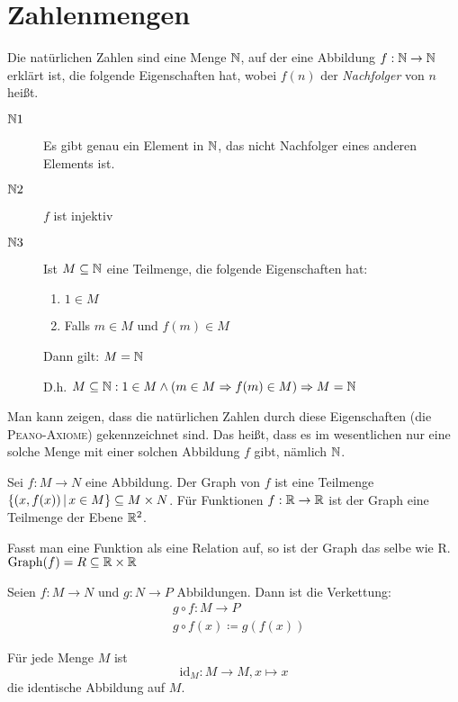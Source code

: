 \section{Zahlenmengen}
Die natürlichen Zahlen sind eine Menge $\mathbb{N}$, auf der eine Abbildung $f:\mathbb{N}\rightarrow\mathbb{N}$ erklärt ist, die folgende Eigenschaften hat, wobei $f(n)$ der \emph{Nachfolger} von $n$ heißt.
\begin{description}
  \item[$\mathbb{N} 1$] Es gibt genau ein Element in $\mathbb{N}$, das nicht Nachfolger eines anderen Elements ist.
  \item[$\mathbb{N} 2$] $f$ ist injektiv
  \item[$\mathbb{N} 3$] Ist $M\subseteq \mathbb{N}$ eine Teilmenge, die folgende Eigenschaften hat:
  \begin{enumerate}
    \item $1\in M$
    \item Falls $m\in M$ und $f(m)\in M$
  \end{enumerate}
  Dann gilt: $M = \mathbb{N}$

  D.h. $M\subseteq \mathbb{N} : 1\in M \wedge (m\in M \Rightarrow f(m)\in M) \Rightarrow M=\mathbb{N}$
\end{description}

Man kann zeigen, dass die natürlichen Zahlen durch diese Eigenschaften (die \textsc{Peano-Axiome}) gekennzeichnet sind. Das heißt, dass es im wesentlichen nur eine solche Menge mit einer solchen Abbildung $f$ gibt, nämlich $\mathbb{N}$.


Sei $f:M\rightarrow N$ eine Abbildung. Der Graph von $f$ ist eine Teilmenge $\left\{ (x,f(x)) \,\middle|\, x\in M \right\}\subseteq M\times N$.
Für Funktionen $f:\mathbb{R}\rightarrow\mathbb{R}$ ist der Graph eine Teilmenge der Ebene $\mathbb{R}^2$.

Fasst man eine Funktion als eine Relation auf, so ist der Graph das selbe wie R. $\mathrm{Graph}(f)=R\subseteq\mathbb{R}\times\mathbb{R}$

Seien $f:M\rightarrow N$ und $g:N\rightarrow P$ Abbildungen. Dann ist die Verkettung:
\begin{align*}
  &g\circ f:M\rightarrow P\\
  &g\circ f(x)\coloneqq g(f(x))
\end{align*}

Für jede Menge $M$ ist
\begin{equation*}
  \mathrm{id}_M:M\rightarrow M, x\mapsto x
\end{equation*}
die identische Abbildung auf $M$.

